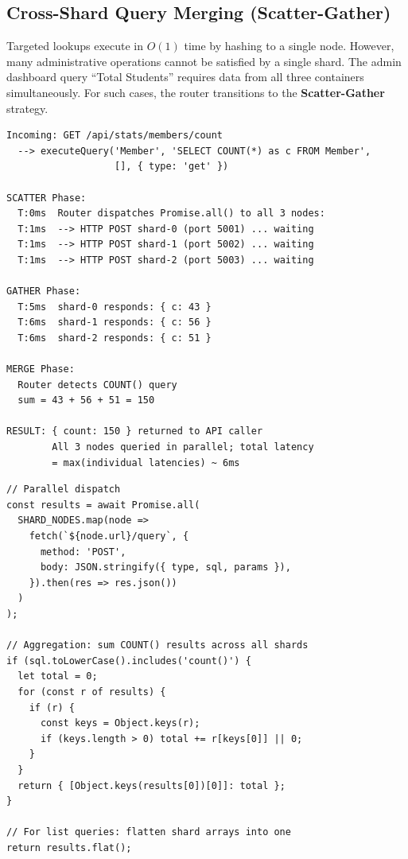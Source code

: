 \documentclass[sigconf]{acmart}
\begin{document}
\subsection{Cross-Shard Query Merging (Scatter-Gather)}

Targeted lookups execute in $O(1)$ time by hashing to a single node. However, many administrative operations cannot be satisfied by a single shard. The admin dashboard query ``Total Students'' requires data from all three containers simultaneously. For such cases, the router transitions to the \textbf{Scatter-Gather} strategy.

\begin{lstlisting}[style=logstyle, caption={Scatter-Gather in Action: Admin Dashboard Statistics}]
Incoming: GET /api/stats/members/count
  --> executeQuery('Member', 'SELECT COUNT(*) as c FROM Member',
                   [], { type: 'get' })

SCATTER Phase:
  T:0ms  Router dispatches Promise.all() to all 3 nodes:
  T:1ms  --> HTTP POST shard-0 (port 5001) ... waiting
  T:1ms  --> HTTP POST shard-1 (port 5002) ... waiting
  T:1ms  --> HTTP POST shard-2 (port 5003) ... waiting

GATHER Phase:
  T:5ms  shard-0 responds: { c: 43 }
  T:6ms  shard-1 responds: { c: 56 }
  T:6ms  shard-2 responds: { c: 51 }

MERGE Phase:
  Router detects COUNT() query
  sum = 43 + 56 + 51 = 150

RESULT: { count: 150 } returned to API caller
        All 3 nodes queried in parallel; total latency
        = max(individual latencies) ~ 6ms
\end{lstlisting}

\begin{lstlisting}[style=jsstyle, caption={Scatter-Gather Aggregation Logic (sharding/router.js)}]
// Parallel dispatch
const results = await Promise.all(
  SHARD_NODES.map(node =>
    fetch(`${node.url}/query`, {
      method: 'POST',
      body: JSON.stringify({ type, sql, params }),
    }).then(res => res.json())
  )
);

// Aggregation: sum COUNT() results across all shards
if (sql.toLowerCase().includes('count()') {
  let total = 0;
  for (const r of results) {
    if (r) {
      const keys = Object.keys(r);
      if (keys.length > 0) total += r[keys[0]] || 0;
    }
  }
  return { [Object.keys(results[0])[0]]: total };
}

// For list queries: flatten shard arrays into one
return results.flat();
\end{lstlisting}
\end{document}
